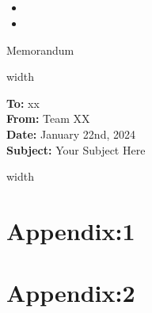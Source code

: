 \documentclass[12pt]{article}  %
\begin{document}
\subsection{}  %
  \begin{itemize}  %
  	\item 
  	\item 
  \end{itemize}
   


\clearpage   %
\begin{thebibliography}{99}
	
\end{thebibliography}

%  
\newpage
\begin{center}
	\Huge{\texorpdfstring{%
			Memorandum}{Memorandum}}
\end{center}

\leaders\vrule width \linewidth\vskip 2pt %
\vspace{-10pt} %

\begin{flushleft}
	\textbf{To:} xx \\
	\textbf{From:} Team XX \\
	\textbf{Date:} January 22nd, 2024 \\
	\textbf{Subject:} Your Subject Here%
\end{flushleft}


\leaders\vrule width \linewidth\vskip 2pt %


	
\newpage
\appendix
\section{Appendix:1}


\section{Appendix:2}












   
   
\end{document}
